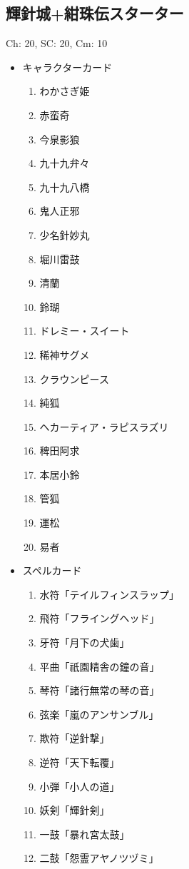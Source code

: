 \documentclass[line_length=22zw,number_of_lines=45,twocolumn]{jlreq}
\begin{document}
\subsection{輝針城+紺珠伝スターター}
Ch: 20, SC: 20, Cm: 10
\begin{itemize}
	\item キャラクターカード
		\begin{enumerate}
			\item わかさぎ姫
			\item 赤蛮奇
			\item 今泉影狼
			\item 九十九弁々
			\item 九十九八橋
			\item 鬼人正邪
			\item 少名針妙丸
			\item 堀川雷鼓
			\item 清蘭
			\item 鈴瑚
			\item ドレミー・スイート
			\item 稀神サグメ
			\item クラウンピース
			\item 純狐
			\item ヘカーティア・ラピスラズリ
			\item 稗田阿求
			\item 本居小鈴
			\item 管狐
			\item 運松
			\item 易者
		\end{enumerate}
	\item スペルカード
		\begin{enumerate}
			\item 水符「テイルフィンスラップ」
			\item 飛符「フライングヘッド」
			\item 牙符「月下の犬歯」
			\item 平曲「祇園精舎の鐘の音」
			\item 琴符「諸行無常の琴の音」
			\item 弦楽「嵐のアンサンブル」
			\item 欺符「逆針撃」
			\item 逆符「天下転覆」
			\item 小弾「小人の道」
			\item 妖剣「輝針剣」
			\item 一鼓「暴れ宮太鼓」
			\item 二鼓「怨霊アヤノツヅミ」

\end{enumerate}
\end{itemize}
\end{document}
